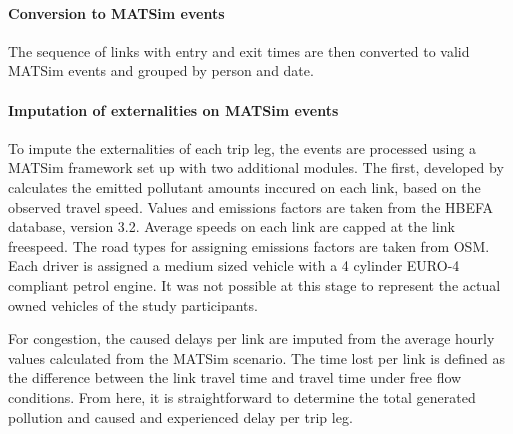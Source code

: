 \paragraph{Conversion to MATSim events} 
The sequence of links with entry and exit times are then converted to valid MATSim events and grouped by person and date.

\paragraph{Imputation of externalities on MATSim events}
To impute the externalities of each trip leg, the events are processed using a MATSim framework set up with two additional modules.
The first, developed by \citet{kaddoura2017simulation} calculates the emitted pollutant amounts inccured on each link, based on the observed travel speed.
Values and emissions factors are taken from the HBEFA database, version 3.2.
Average speeds on each link are capped at the link freespeed.
The road types for assigning emissions factors are taken from OSM.
Each driver is assigned a medium sized vehicle with a 4 cylinder EURO-4 compliant petrol engine.
It was not possible at this stage to represent the actual owned vehicles of the study participants.

For congestion, the caused delays per link are imputed from the average hourly values calculated from the MATSim scenario.
The time lost per link is defined as the difference between the link travel time and travel time under free flow conditions.
From here, it is straightforward to determine the total generated pollution and caused and experienced delay per trip leg.
